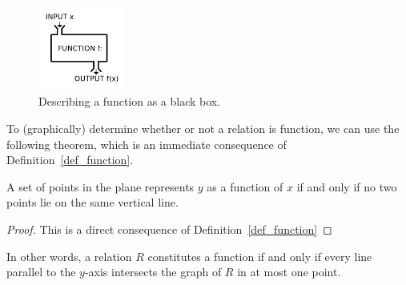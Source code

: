 \begin{figure}[H]
	\begin{center}
	\includegraphics[width=0.25\textwidth]{fig_functions_8}
	\caption{Describing a function as a black box.}
	\label{fig_functions_8}
	\end{center}
\end{figure}




To (graphically) determine whether or not a relation is function, we can use the following theorem, which is an immediate consequence of Definition~\ref{def_function}. 

\begin{theorem}
\label{VLT}
A set of points in the plane represents $y$ as a function of $x$ if and only if no two points lie on the same vertical line.
\end{theorem}
\ifanalysis
\begin{proof}
This is a direct consequence of Definition~\ref{def_function}
\end{proof}
\fi
\ifanalysis In other words, a relation $R$ constitutes a function if and only if every line parallel to the $y$-axis intersects the graph of $R$ in at most one point. \fi 


